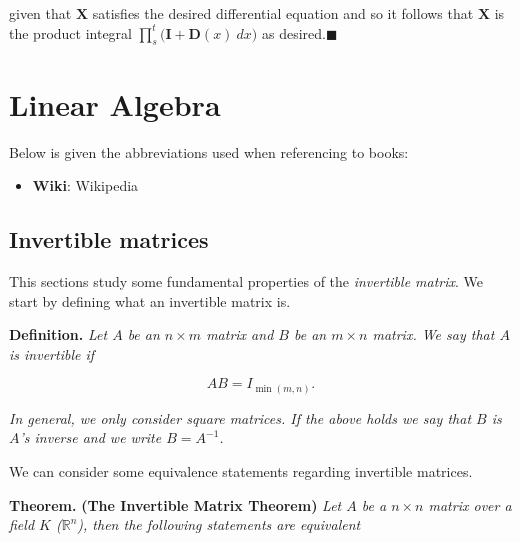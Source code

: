 \documentclass[a4paper,12pt,openany]{book}
\providecommand{\tightlist}{%
 \setlength{\itemsep}{0pt}\setlength{\parskip}{0pt}}
\begin{document}
given that \(\mathbf{X}\) satisfies the desired differential equation and so it follows that \(\mathbf{X}\) is the product integral \(\prod_{s}^t\big(\mathbf{I}+\mathbf{D}(x)\ dx\big)\) as desired.\(\blacksquare\)

\hypertarget{linear-algebra}{%
\chapter{Linear Algebra}\label{linear-algebra}}

Below is given the abbreviations used when referencing to books:

\begin{itemize}
\tightlist
\item
  \textbf{Wiki}: Wikipedia
\end{itemize}

\hypertarget{invertible-matrices}{%
\section{Invertible matrices}\label{invertible-matrices}}

This sections study some fundamental properties of the \emph{invertible matrix}. We start by defining what an invertible matrix is.

\textbf{Definition.} \emph{Let \(A\) be an \(n\times m\) matrix and \(B\) be an \(m\times n\) matrix. We say that \(A\) is invertible if}

\[
AB=I_{\min(m,n)}.
\]

\emph{In general, we only consider square matrices. If the above holds we say that \(B\) is \(A\)'s inverse and we write \(B=A^{-1}\).}

We can consider some equivalence statements regarding invertible matrices.

\textbf{Theorem.} \textbf{(The Invertible Matrix Theorem)} \emph{Let \(A\) be a \(n\times n\) matrix over a field \(K\) (\(\mathbb{R}^n\)), then the following statements are equivalent}
\end{document}
